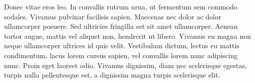 Donec vitae eros leo. In convallis rutrum urna, ut fermentum sem commodo
sodales. Vivamus pulvinar facilisis sapien. Maecenas nec dolor ac dolor
ullamcorper posuere. Sed ultricies fringilla est sit amet ullamcorper. Aenean
tortor augue, mattis vel aliquet non, hendrerit ut libero. Vivamus eu magna non
neque ullamcorper ultrices id quis velit. Vestibulum dictum, lectus eu mattis
condimentum, lacus lorem cursus sapien, vel convallis lorem nunc adipiscing
nunc. Proin eget laoreet odio. Vivamus dignissim, diam nec scelerisque egestas,
turpis nulla pellentesque est, a dignissim magna turpis scelerisque elit.
